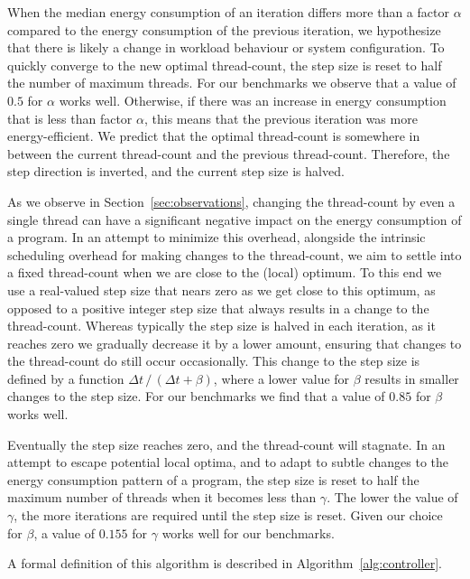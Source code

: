 When the median energy consumption of an iteration differs more than a factor $\alpha$ compared to the energy consumption of the previous iteration, we hypothesize that there is likely a change in workload behaviour or system configuration.
To quickly converge to the new optimal thread-count, the step size is reset to half the number of maximum threads.
For our benchmarks we observe that a value of $0.5$ for $\alpha$ works well.
Otherwise, if there was an increase in energy consumption that is less than factor $\alpha$, this means that the previous iteration was more energy-efficient.
We predict that the optimal thread-count is somewhere in between the current thread-count and the previous thread-count.
Therefore, the step direction is inverted, and the current step size is halved.

As we observe in Section~\ref{sec:observations}, changing the thread-count by even a single thread can have a significant negative impact on the energy consumption of a program.
In an attempt to minimize this overhead, alongside the intrinsic scheduling overhead for making changes to the thread-count, we aim to settle into a fixed thread-count when we are close to the (local) optimum.
To this end we use a real-valued step size that nears zero as we get close to this optimum, as opposed to a positive integer step size that always results in a change to the thread-count.
Whereas typically the step size is halved in each iteration, as it reaches zero we gradually decrease it by a lower amount, ensuring that changes to the thread-count do still occur occasionally.
This change to the step size is defined by a function $\Delta t\, /\, (\Delta t + \beta)$, where a lower value for $\beta$ results in smaller changes to the step size.
For our benchmarks we find that a value of $0.85$ for $\beta$ works well.

Eventually the step size reaches zero, and the thread-count will stagnate.
In an attempt to escape potential local optima, and to adapt to subtle changes to the energy consumption pattern of a program, the step size is reset to half the maximum number of threads when it becomes less than $\gamma$.
The lower the value of $\gamma$, the more iterations are required until the step size is reset.
Given our choice for $\beta$, a value of $0.155$ for $\gamma$ works well for our benchmarks.

A formal definition of this algorithm is described in Algorithm~\ref{alg:controller}.

